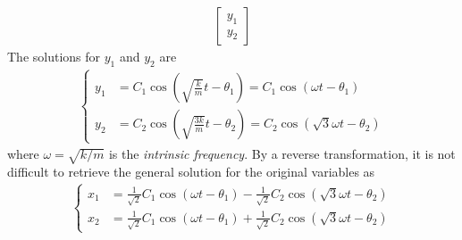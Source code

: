 \begin{Answer}
\begin{align*}
\begin{bmatrix}
y_1\\
y_2
\end{bmatrix}
\end{align*}
The solutions for $y_1$ and $y_2$ are
\begin{align*}
\left\{\begin{alignedat}{1}
y_1 &= C_1\cos(\sqrt{\frac{k}{m}}t-\theta_1) = C_1\cos(\omega t-\theta_1)\\
y_2 &= C_2\cos(\sqrt{\frac{3k}{m}}t-\theta_2) = C_2\cos(\sqrt{3}\omega t-\theta_2)
\end{alignedat}\right.
\end{align*}
where $\omega = \sqrt{k/m}$ is the \textit{intrinsic frequency}. By a reverse transformation, it is not difficult to retrieve the general solution for the original variables as
\begin{align*}
\left\{\begin{alignedat}{1}
x_1 &= \frac{1}{\sqrt{2}}C_1\cos(\omega t-\theta_1) - \frac{1}{\sqrt{2}}C_2\cos(\sqrt{3}\omega t-\theta_2)\\
x_2 &= \frac{1}{\sqrt{2}}C_1\cos(\omega t-\theta_1) + \frac{1}{\sqrt{2}}C_2\cos(\sqrt{3}\omega t-\theta_2)
\end{alignedat}\right.
\end{align*}
\end{Answer}